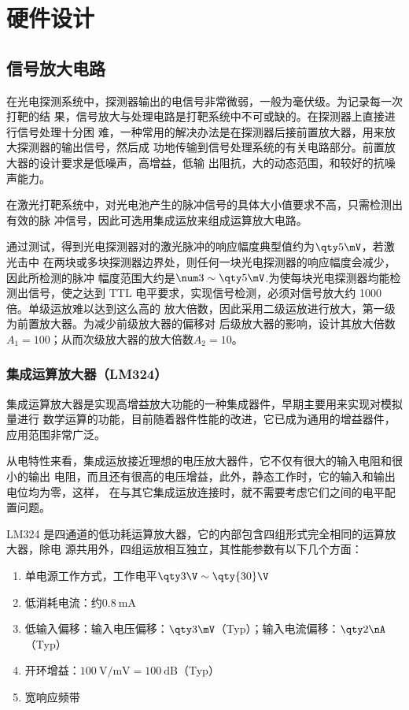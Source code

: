 \chapter{硬件设计}

\section{信号放大电路}

在光电探测系统中，探测器输出的电信号非常微弱，一般为毫伏级。为记录每一次打靶的结
果，信号放大与处理电路是打靶系统中不可或缺的。在探测器上直接进行信号处理十分困
难，一种常用的解决办法是在探测器后接前置放大器，用来放大探测器的输出信号，然后成
功地传输到信号处理系统的有关电路部分。前置放大器的设计要求是低噪声，高增益，低输
出阻抗，大的动态范围，和较好的抗噪声能力。

在激光打靶系统中，对光电池产生的脉冲信号的具体大小值要求不高，只需检测出有效的脉
冲信号，因此可选用集成运放来组成运算放大电路。

通过测试，得到光电探测器对的激光脉冲的响应幅度典型值约为$\qty5\mV$，若激光击中
在两块或多块探测器边界处，则任何一块光电探测器的响应幅度会减少，因此所检测的脉冲
幅度范围大约是$\num3\sim\qty5\mV$.为使每块光电探测器均能检测出信号，使之达到
TTL 电平要求，实现信号检测，必须对信号放大约 1000 倍。单级运放难以达到这么高的
放大倍数，因此采用二级运放进行放大，第一级为前置放大器。为减少前级放大器的偏移对
后级放大器的影响，设计其放大倍数$A_1=100$；从而次级放大器的放大倍数$A_2=10$。

\subsection{集成运算放大器（LM324）}

集成运算放大器是实现高增益放大功能的一种集成器件\cite{cn9}，早期主要用来实现对模拟量进行
数学运算的功能，目前随着器件性能的改进，它已成为通用的增益器件，应用范围非常广泛。

从电特性来看，集成运放接近理想的电压放大器件，它不仅有很大的输入电阻和很小的输出
电阻，而且还有很高的电压增益，此外，静态工作时，它的输入和输出电位均为零，这样，
在与其它集成运放连接时，就不需要考虑它们之间的电平配置问题。

LM324 是四通道的低功耗运算放大器，它的内部包含四组形式完全相同的运算放大器，除电
源共用外，四组运放相互独立，其性能参数有以下几个方面：

\begin{enumerate}
  \item 单电源工作方式，工作电平$\qty3\V\sim\qty{30}\V$
  \item 低消耗电流：约$\qty{0.8}\mA$
  \item 低输入偏移：输入电压偏移：$\qty3\mV$（Typ）；输入电流偏移：$\qty2\nA$（Typ）
  \item 开环增益：$\qty{100}\V/\unit\mV=\qty{100}\dB$（Typ）
  \item 宽响应频带
\end{enumerate}

